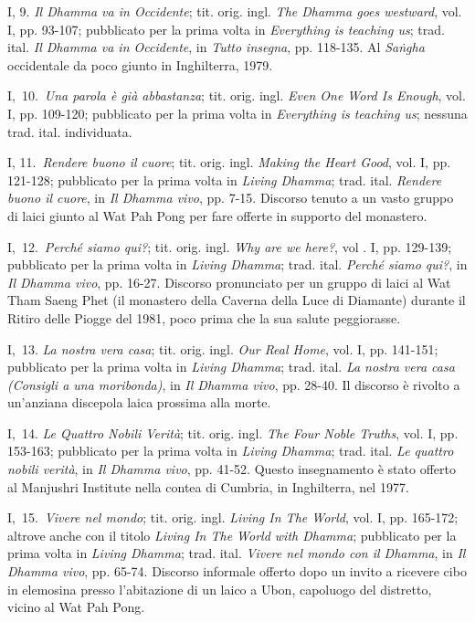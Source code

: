 I, 9. \emph{Il Dhamma va in Occidente}; tit. orig. ingl. \emph{The
Dhamma goes westward}, vol. I, pp. 93-107; pubblicato per la prima volta
in \emph{Everything is teaching us}; trad. ital. \emph{Il Dhamma va in
Occidente}, in \emph{Tutto insegna}, pp. 118-135. Al \emph{Saṅgha}
occidentale da poco giunto in Inghilterra, 1979.

I,~10.~\emph{Una parola è già abbastanza}; tit. orig. ingl. \emph{Even
One Word Is Enough}, vol. I, pp. 109-120; pubblicato per la prima volta
in \emph{Everything is teaching us}; nessuna trad. ital. individuata.

I, 11.~\emph{Rendere buono il cuore}; tit. orig. ingl. \emph{Making the
Heart Good}, vol. I, pp. 121-128; pubblicato per la prima volta in
\emph{Living Dhamma}; trad. ital. \emph{Rendere buono il cuore}, in
\emph{Il Dhamma vivo}, pp. 7-15. Discorso tenuto a un vasto gruppo di
laici giunto al Wat Pah Pong per fare offerte in supporto del monastero.

I,~12.~\emph{Perché siamo qui?}; tit. orig. ingl. \emph{Why are we
here?}, vol . I, pp. 129-139; pubblicato per la prima volta in
\emph{Living Dhamma}; trad. ital. \emph{Perché siamo qui?}, in \emph{Il
Dhamma vivo}, pp. 16-27. Discorso pronunciato per un gruppo di laici al
Wat Tham Saeng Phet (il monastero della Caverna della Luce di Diamante)
durante il Ritiro delle Piogge del 1981, poco prima che la sua salute
peggiorasse.

I,~13. \emph{La nostra vera casa}; tit. orig. ingl. \emph{Our Real
Home}, vol. I, pp. 141-151; pubblicato per la prima volta in
\emph{Living Dhamma}; trad. ital. \emph{La nostra vera casa (Consigli a
una moribonda)}, in \emph{Il Dhamma vivo}, pp. 28-40. Il discorso è
rivolto a un'anziana discepola laica prossima alla morte.

I,~14. \emph{Le Quattro Nobili Verità}; tit. orig. ingl. \emph{The Four
Noble Truths}, vol. I, pp. 153-163; pubblicato per la prima volta in
\emph{Living Dhamma}; trad. ital. \emph{Le quattro nobili verità}, in
\emph{Il Dhamma vivo}, pp. 41-52. Questo insegnamento è stato offerto al
Manjushri Institute nella contea di Cumbria, in Inghilterra, nel 1977.

I,~15.~\emph{Vivere nel mondo}; tit. orig. ingl. \emph{Living In The
World}, vol. I, pp. 165-172; altrove anche con il titolo \emph{Living In
The World with Dhamma}; pubblicato per la prima volta in \emph{Living
Dhamma}; trad. ital. \emph{Vivere nel mondo con il Dhamma}, in \emph{Il
Dhamma vivo}, pp. 65-74. Discorso informale offerto dopo un invito a
ricevere cibo in elemosina presso l'abitazione di un laico a Ubon,
capoluogo del distretto, vicino al Wat Pah Pong.

